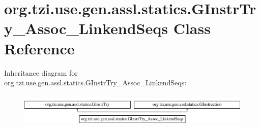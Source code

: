 \hypertarget{classorg_1_1tzi_1_1use_1_1gen_1_1assl_1_1statics_1_1_g_instr_try___assoc___linkend_seqs}{\section{org.\-tzi.\-use.\-gen.\-assl.\-statics.\-G\-Instr\-Try\-\_\-\-Assoc\-\_\-\-Linkend\-Seqs Class Reference}
\label{classorg_1_1tzi_1_1use_1_1gen_1_1assl_1_1statics_1_1_g_instr_try___assoc___linkend_seqs}
}
Inheritance diagram for org.\-tzi.\-use.\-gen.\-assl.\-statics.\-G\-Instr\-Try\-\_\-\-Assoc\-\_\-\-Linkend\-Seqs\-:\begin{figure}[H]
\begin{center}
\leavevmode
\includegraphics[height=1.623188cm]{classorg_1_1tzi_1_1use_1_1gen_1_1assl_1_1statics_1_1_g_instr_try___assoc___linkend_seqs}
\end{center}
\end{figure}
